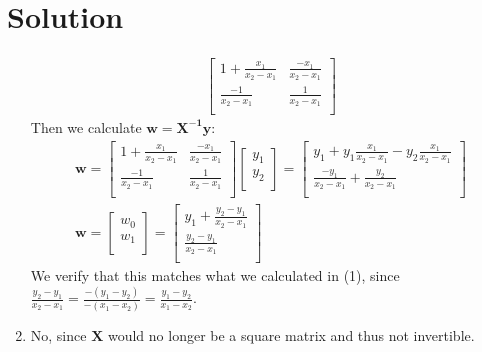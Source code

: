 \documentclass{harvardml}
\theoremstyle{definition}
\theoremstyle{plain}
\newenvironment{solution}
  {\color{blue}\section*{Solution}}
{}
\begin{document}
\begin{solution}
\begin{enumerate}
\begin{align*}
\begin{bmatrix}
                1 + \frac{x_1}{x_2-x_1} & \frac{-x_1}{x_2-x_1} \\
                \frac{-1}{x_2-x_1} & \frac{1}{x_2-x_1} \\
        \end{bmatrix}
        \end{align*}
        Then we calculate $\mathbf{w} = \mathbf{X^{-1}}\mathbf{y}$:
        \begin{align*}
            \mathbf{w} = \begin{bmatrix}
                1 + \frac{x_1}{x_2-x_1} & \frac{-x_1}{x_2-x_1} \\
                \frac{-1}{x_2-x_1} & \frac{1}{x_2-x_1} \\
        \end{bmatrix}\begin{bmatrix}
                y_1 \\
                y_2 \\
        \end{bmatrix} = \begin{bmatrix}
                y_1 + y_1\frac{x_1}{x_2-x_1} - y_2\frac{x_1}{x_2-x_1} \\
                \frac{-y_1}{x_2-x_1} + \frac{y_2}{x_2-x_1} \\
        \end{bmatrix} \\
        \mathbf{w} = \begin{bmatrix}
                w_0 \\
                w_1 \\
        \end{bmatrix}  = \begin{bmatrix}
                y_1 + \frac{y_2-y_1}{x_2-x_1} \\
                \frac{y_2 - y_1}{x_2-x_1}\\
        \end{bmatrix} 
        \end{align*}
        We verify that this matches what we calculated in (1), since $\frac{y_2-y_1}{x_2-x_1} = \frac{-(y_1-y_2)}{-(x_1-x_2)} = \frac{y_1-y_2}{x_1-x_2}$.
        \item No, since $\mathbf{X}$ would no longer be a square matrix and thus not invertible.
    \end{enumerate}
\end{solution}

\color{black}
\newpage
\end{document}
